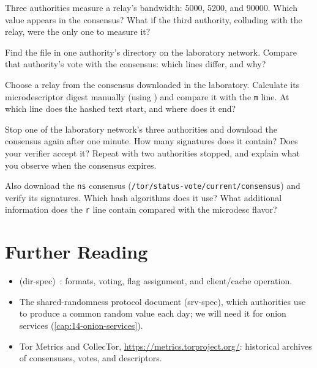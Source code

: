 \begin{esercizio}[2]\label{es:12-mediana}
Three authorities measure a relay's bandwidth: 5000, 5200, and 90000. Which value appears in the consensus? What if the third authority, colluding with the relay, were the only one to measure it?
\end{esercizio}

\begin{esercizio}[2]\label{es:12-voti}
Find the  file in one authority's directory on the laboratory network. Compare that authority's vote with the consensus: which lines differ, and why?
\end{esercizio}

\begin{esercizio}[2]\label{es:12-md}
Choose a relay from the consensus downloaded in the laboratory. Calculate its microdescriptor digest manually (using ) and compare it with the \texttt{m} line. At which line does the hashed text start, and where does it end?
\end{esercizio}

\begin{esercizio}[3]\label{es:12-autorita}
Stop one of the laboratory network's three authorities and download the consensus again after one minute. How many signatures does it contain? Does your verifier accept it? Repeat with two authorities stopped, and explain what you observe when the consensus expires.
\end{esercizio}

\begin{esercizio}[3]\label{es:12-ns}
Also download the \texttt{ns} consensus (\nolinkurl{/tor/status-vote/current/consensus}) and verify its signatures. Which hash algorithms does it use? What additional information does the \texttt{r} line contain compared with the microdesc flavor?
\end{esercizio}

\section*{Further Reading}
\begin{itemize}
  \item {} (dir-spec)~\cite{torspec}: formats, voting, flag assignment, and client/cache operation.
  \item The shared-randomness protocol document (srv-spec), which authorities use to produce a common random value each day; we will need it for onion services (\cref{cap:14-onion-services}).
  \item Tor Metrics and CollecTor, \url{https://metrics.torproject.org/}: historical archives of consensuses, votes, and descriptors.
\end{itemize}
